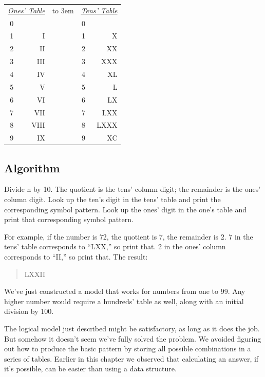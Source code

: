 \bigskip
\begin{tabular}{crccr}
\multicolumn{2}{c}{\underline{\emph{Ones' Table}}} &
\hbox to 3em{\hss} & \multicolumn{2}{c}{\underline{\emph{Tens' Table}}} \\
 0 &          & &     0 & \\
 1 &       I  & &     1 &      X \\
 2 &      II  & &     2 &     XX \\
 3 &     III  & &     3 &    XXX \\
 4 &      IV  & &     4 &     XL \\
 5 &       V  & &     5 &      L \\
 6 &      VI  & &     6 &     LX \\
 7 &     VII  & &     7 &    LXX \\
 8 &    VIII  & &     8 &   LXXX \\
 9 &      IX  & &     9 &     XC \\
\end{tabular}
\bigskip

\subsection{Algorithm}

Divide n by 10. The quotient is the tens' column digit; the remainder is
the ones' column digit. Look up the ten's digit in the tens' table and print
the corresponding symbol pattern. Look up the ones' digit in the one's
table and print that corresponding symbol pattern.

For example, if the number is 72, the quotient is 7, the remainder is
2. 7 in the tens' table corresponds to ``LXX,'' so print that. 2 in the ones'
column corresponds to ``II,'' so print that. The result:

\begin{quote}
{\sf LXXII}
\end{quote}
We've just constructed a model that works for numbers from one to 99.
Any higher number would require a hundreds' table as well, along with
an initial division by 100.

The logical model just described might be satisfactory, as long as it
does the job. But somehow it doesn't seem we've fully solved the problem.
We avoided figuring out how to produce the basic pattern by storing
all possible combinations in a series of tables. Earlier in this chapter we
observed that calculating an answer, if it's possible, can be easier than
using a data structure.

